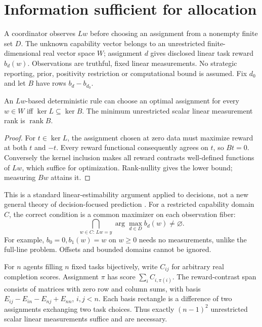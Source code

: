 \section{Information sufficient for allocation}\label{sec:02-information-1}
A coordinator observes $Lw$ before choosing an assignment from a nonempty
finite set $D$. The unknown capability vector belongs to an unrestricted
finite-dimensional real vector space $W$; assignment $d$ gives disclosed
linear task reward $b_d(w)$. Observations are truthful, fixed linear
measurements. No strategic reporting, prior, positivity restriction or
computational bound is assumed. Fix $d_0$ and let $B$ have rows $b_d-b_{d_0}$.

\begin{theorem}\label{result:02-information-1}
An $Lw$-based deterministic rule can choose an optimal assignment for every
$w\in W$ iff $\ker L\subseteq\ker B$. The minimum unrestricted scalar
linear measurement rank is $\operatorname{rank}B$.
\end{theorem}
\begin{proof}
For $t\in\ker L$, the assignment chosen at zero data must maximize reward
at both $t$ and $-t$. Every reward functional consequently agrees on $t$,
so $Bt=0$. Conversely the kernel inclusion makes all reward contrasts
well-defined functions of $Lw$, which suffice for optimization. Rank-nullity
gives the lower bound; measuring $Bw$ attains it.
\end{proof}
This is a standard linear-estimability argument applied to decisions, not a
new general theory of decision-focused prediction \citep{elmachtoub2020}.
For a restricted capability domain $C$, the correct condition is a common
maximizer on each observation fiber:
\[
 \bigcap_{w\in C:\,Lw=y}\arg\max_{d\in D}b_d(w)\ne\varnothing.
\]
For example, $b_0=0,b_1(w)=w$ on $w\ge0$ needs no measurements, unlike
the full-line problem. Offsets and bounded domains cannot be ignored.

For $n$ agents filling $n$ fixed tasks bijectively, write $C_{ij}$ for arbitrary
real completion scores. Assignment $\pi$ has score $\sum_i C_{i,\pi(i)}$.
The reward-contrast span consists of matrices with zero row and column sums,
with basis
$E_{ij}-E_{in}-E_{nj}+E_{nn}$, $i,j<n$. Each basis rectangle is a difference
of two assignments exchanging two task choices. Thus exactly $(n-1)^2$
unrestricted scalar linear measurements suffice and are necessary.

